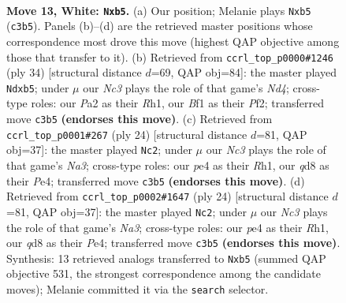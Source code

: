 \documentclass[11pt]{article}
\begin{document}
\clearpage

\begin{figure}[p]\centering
\begin{subfigure}{0.46\textwidth}\centering
\resizebox{\linewidth}{!}{%
\newchessgame
\chessboard[
  setfen={rnbqk2r/4bp2/2p5/pp1p3p/3Pp2P/2N5/PP3PP1/R2QKBNR w KQkq - 0 13},
  showmover=false,
  pgfstyle=straightmove, color=movearrow, markmove={c3-b5}
]}
\caption{}
\end{subfigure}\hfill
\begin{subfigure}{0.46\textwidth}\centering
\resizebox{\linewidth}{!}{%
\newchessgame
\chessboard[
  setfen={2bqk2r/4bpp1/r6p/ppPpP3/2pN4/2N1P3/P1Q2PPP/R3K2R w KQk - 0 18},
  showmover=false,
  pgfstyle=straightmove, color=movearrow, markmove={d4-b5}
]}
\caption{}
\end{subfigure}
\\[4pt]
\begin{subfigure}{0.46\textwidth}\centering
\resizebox{\linewidth}{!}{%
\newchessgame
\chessboard[
  setfen={r1bqk2r/5ppp/p1np4/1p1Np1b1/4P3/N1P5/PP3PPP/R2QKB1R w KQkq - 1 13},
  showmover=false,
  pgfstyle=straightmove, color=movearrow, markmove={a3-c2}
]}
\caption{}
\end{subfigure}\hfill
\begin{subfigure}{0.46\textwidth}\centering
\resizebox{\linewidth}{!}{%
\newchessgame
\chessboard[
  setfen={r1bqk2r/5ppp/p1np4/1p1Np1b1/4P3/N1P5/PP3PPP/R2QKB1R w KQkq - 1 13},
  showmover=false,
  pgfstyle=straightmove, color=movearrow, markmove={a3-c2}
]}
\caption{}
\end{subfigure}
\caption{\textbf{Move 13, White: \texttt{Nxb5}.} (a) Our position; Melanie plays \texttt{Nxb5} (\texttt{c3b5}). Panels (b)--(d) are the retrieved master positions whose correspondence most drove this move (highest QAP objective among those that transfer to it). (b) Retrieved from \texttt{ccrl\_top\_p0000\#1246} (ply 34) [structural distance $d$=69, QAP obj=84]: the master played \texttt{Ndxb5}; under $\mu$ our \emph{Nc3} plays the role of that game's \emph{Nd4}; cross-type roles: our \emph{P}a2 as their \emph{R}h1, our \emph{B}f1 as their \emph{P}f2; transferred move \texttt{c3b5} \textbf{(endorses this move)}. (c) Retrieved from \texttt{ccrl\_top\_p0001\#267} (ply 24) [structural distance $d$=81, QAP obj=37]: the master played \texttt{Nc2}; under $\mu$ our \emph{Nc3} plays the role of that game's \emph{Na3}; cross-type roles: our \emph{p}e4 as their \emph{R}h1, our \emph{q}d8 as their \emph{P}e4; transferred move \texttt{c3b5} \textbf{(endorses this move)}. (d) Retrieved from \texttt{ccrl\_top\_p0002\#1647} (ply 24) [structural distance $d$=81, QAP obj=37]: the master played \texttt{Nc2}; under $\mu$ our \emph{Nc3} plays the role of that game's \emph{Na3}; cross-type roles: our \emph{p}e4 as their \emph{R}h1, our \emph{q}d8 as their \emph{P}e4; transferred move \texttt{c3b5} \textbf{(endorses this move)}. Synthesis: 13 retrieved analogs transferred to \texttt{Nxb5} (summed QAP objective 531, the strongest correspondence among the candidate moves); Melanie committed it via the \texttt{search} selector.}
\label{fig:thought-m24}
\end{figure}
\end{document}
